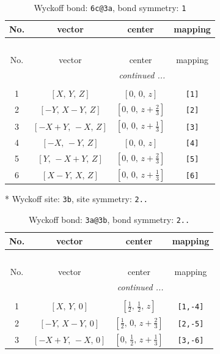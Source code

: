 \documentclass[fleqn,8pt]{jsarticle}
\begin{document}
\renewcommand{\arraystretch}{1.2}
\begin{longtable}{cccc}
\caption{Wyckoff bond: {\tt 6c@3a}, bond symmetry: {\tt 1}}
 \\
 \hline \hline
No. & vector & center & mapping \\ \hline \endfirsthead

\multicolumn{3}{l}{\tablename\ \thetable{}} \\
 \hline \hline
No. & vector & center & mapping \\ \hline \endhead

 \hline \hline
\multicolumn{3}{r}{\footnotesize\it continued ...} \\ \endfoot

 \hline \hline
\multicolumn{3}{r}{} \\ \endlastfoot

1 & $\left[ X,\, Y,\, Z \right]$ & $\left[ 0,\, 0,\, z \right]$ & {\tt [1]} \\ \hline
2 & $\left[ - Y,\, X - Y,\, Z \right]$ & $\left[ 0,\, 0,\, z + \frac{2}{3} \right]$ & {\tt [2]} \\ \hline
3 & $\left[ - X + Y,\, - X,\, Z \right]$ & $\left[ 0,\, 0,\, z + \frac{1}{3} \right]$ & {\tt [3]} \\ \hline
4 & $\left[ - X,\, - Y,\, Z \right]$ & $\left[ 0,\, 0,\, z \right]$ & {\tt [4]} \\ \hline
5 & $\left[ Y,\, - X + Y,\, Z \right]$ & $\left[ 0,\, 0,\, z + \frac{2}{3} \right]$ & {\tt [5]} \\ \hline
6 & $\left[ X - Y,\, X,\, Z \right]$ & $\left[ 0,\, 0,\, z + \frac{1}{3} \right]$ & {\tt [6]} \\
\end{longtable}
* Wyckoff site: {\tt 3b}, site symmetry: {\tt 2..}
\renewcommand{\arraystretch}{1.2}
\begin{longtable}{cccc}
\caption{Wyckoff bond: {\tt 3a@3b}, bond symmetry: {\tt 2..}}
 \\
 \hline \hline
No. & vector & center & mapping \\ \hline \endfirsthead

\multicolumn{3}{l}{\tablename\ \thetable{}} \\
 \hline \hline
No. & vector & center & mapping \\ \hline \endhead

 \hline \hline
\multicolumn{3}{r}{\footnotesize\it continued ...} \\ \endfoot

 \hline \hline
\multicolumn{3}{r}{} \\ \endlastfoot

1 & $\left[ X,\, Y,\, 0 \right]$ & $\left[ \frac{1}{2},\, \frac{1}{2},\, z \right]$ & {\tt [1,-4]} \\ \hline
2 & $\left[ - Y,\, X - Y,\, 0 \right]$ & $\left[ \frac{1}{2},\, 0,\, z + \frac{2}{3} \right]$ & {\tt [2,-5]} \\ \hline
3 & $\left[ - X + Y,\, - X,\, 0 \right]$ & $\left[ 0,\, \frac{1}{2},\, z + \frac{1}{3} \right]$ & {\tt [3,-6]} \\
\end{longtable}
\end{document}
